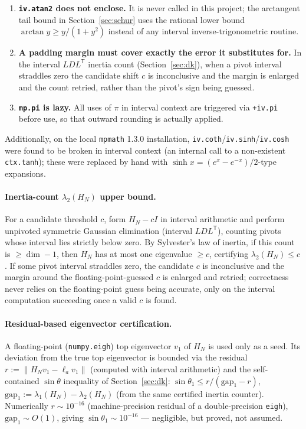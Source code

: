 \documentclass[11pt]{article}
\begin{document}
\begin{enumerate}
\item \textbf{\texttt{iv.atan2} does not enclose.} It is never called in
this project; the arctangent tail bound in Section~\ref{sec:schur} uses the
rational lower bound $\arctan y\ge y/(1+y^2)$ instead of any interval
inverse-trigonometric routine.
\item \textbf{A padding margin must cover exactly the error it substitutes
for.} In the interval $LDL^{\mathsf T}$ inertia count
(Section~\ref{sec:dk}), when a pivot interval straddles zero the candidate
shift $c$ is inconclusive and the margin is enlarged and the count retried,
rather than the pivot's sign being guessed.
\item \textbf{\texttt{mp.pi} is lazy.} All uses of $\pi$ in interval context
are triggered via \texttt{+iv.pi} before use, so that outward rounding is
actually applied.
\end{enumerate}

Additionally, on the local \texttt{mpmath} 1.3.0 installation,
\texttt{iv.coth}/\texttt{iv.sinh}/\texttt{iv.cosh} were found to be broken in
interval context (an internal call to a non-existent \texttt{ctx.tanh});
these were replaced by hand with $\sinh x=(e^x-e^{-x})/2$-type expansions.

\paragraph{Inertia-count $\lambda_2(H_N)$ upper bound.} For a candidate
threshold $c$, form $H_N-cI$ in interval arithmetic and perform
unpivoted symmetric Gaussian elimination (interval $LDL^{\mathsf T}$),
counting pivots whose interval lies strictly below zero. By Sylvester's law
of inertia, if this count is $\ge\dim-1$, then $H_N$ has at most one
eigenvalue $\ge c$, certifying $\lambda_2(H_N)\le c$. If some pivot interval
straddles zero, the candidate $c$ is inconclusive and the margin around the
floating-point-guessed $c$ is enlarged and retried; correctness never relies
on the floating-point guess being accurate, only on the interval computation
succeeding once a valid $c$ is found.

\paragraph{Residual-based eigenvector certification.} A floating-point
(\texttt{numpy.eigh}) top eigenvector $v_1$ of $H_N$ is used only as a seed.
Its deviation from the true top eigenvector is bounded via the residual
$r:=\|H_Nv_1-\ell_a v_1\|$ (computed with interval arithmetic) and the
self-contained $\sin\theta$ inequality of Section~\ref{sec:dk}:
$\sin\theta_1\le r/(\mathrm{gap}_1-r)$, $\mathrm{gap}_1:=\lambda_1(H_N)-\lambda_2(H_N)$
(from the same certified inertia counter). Numerically $r\sim10^{-16}$
(machine-precision residual of a double-precision \texttt{eigh}),
$\mathrm{gap}_1\sim O(1)$, giving $\sin\theta_1\sim10^{-16}$ --- negligible,
but proved, not assumed.
\end{document}
